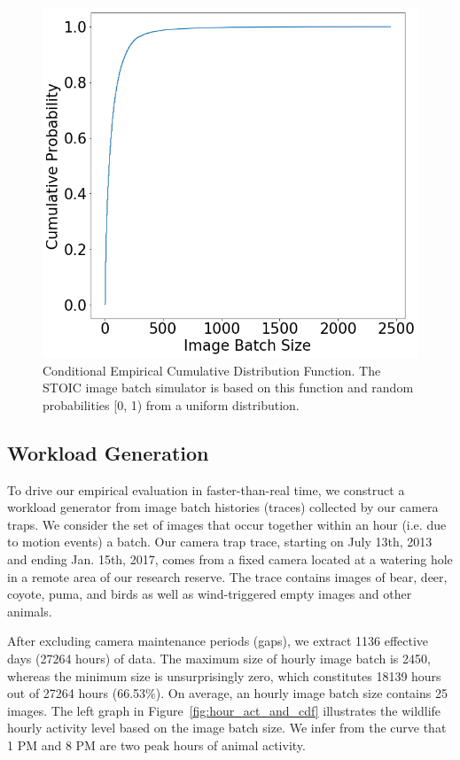 { 
\begin{figure}[t] \centering 
\includegraphics[scale=0.4]{figures/ecdf.png}
\caption{Conditional Empirical Cumulative Distribution Function. The STOIC image batch simulator is based on this function and random probabilities [0, 1) from a uniform distribution.
\label{fig:cecdf}}
\end{figure} 
}
 
\subsection{Workload Generation}
\label{sec:workloadgen}

To drive our empirical evaluation in faster-than-real time,  we construct a workload generator from image batch histories (traces) collected by our camera traps. We consider the set of images that occur together within an hour (i.e. due to motion events) a batch. Our camera trap trace, starting on July 13th, 2013 and ending Jan. 15th, 2017, comes from a fixed camera located at a watering hole in a remote area of our research reserve. The trace contains images of bear, deer, coyote, puma, and birds as well as wind-triggered empty images and other animals.

After excluding camera maintenance periods (gaps), we  extract 1136 effective days (27264 hours) of data. The maximum size of hourly image batch is 2450, whereas the minimum size is unsurprisingly zero, which constitutes 18139 hours out of 27264 hours (66.53\%). On average, an hourly image batch size contains 25 images. The left graph in Figure~\ref{fig:hour_act_and_cdf} illustrates the wildlife  hourly activity level based on the image batch size. We infer from the curve that 1 PM and 8 PM are two peak hours of animal activity.

